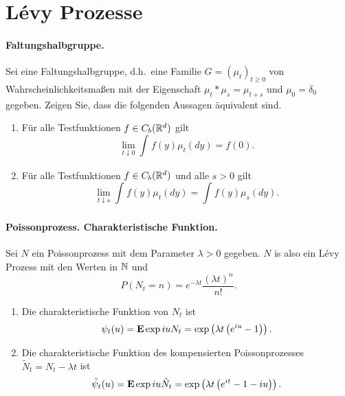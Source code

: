 \section{L\'evy Prozesse}

\paragraph{Faltungshalbgruppe.}
Sei eine Faltungshalbgruppe, d.h.\ eine Familie $G=(\mu_t)_{t\geq 0}$ von
Wahrscheinlichkeitsmaßen mit der Eigenschaft $\mu_t * \mu_s = \mu_{t+s}$ und
$\mu_0 = \delta_0$ gegeben. Zeigen Sie, dass die folgenden Aussagen äquivalent
sind.
\begin{enumerate}
    \item Für alle Testfunktionen $f\in C_b(\mathbb R^d)$ gilt
        \begin{equation*}
            \lim_{t\downarrow 0} \int_{}^{} f(y) \mu_t(dy) = f(0).
        \end{equation*}
    \item Für alle Testfunktionen $f\in C_b(\mathbb R^d)$ und alle $s>0$ gilt
        \begin{equation*}
            \lim_{t\downarrow s} \int_{}^{} f(y) \mu_t(dy) =
            \int_{}^{} f(y) \mu_s(dy). 
        \end{equation*}
\end{enumerate}

\paragraph{Poissonprozess. Charakteristische Funktion. } Sei $N$ ein
Poissonprozess mit dem Parameter $\lambda>0$ gegeben. $N$ is also ein L\'evy
Prozess mit den Werten in $\mathbb N$ und 
\begin{equation*}
    P(N_t = n) = e^{- \lambda t} \frac{ (\lambda t)^n}{ n!}.
\end{equation*}
\begin{enumerate}
    \item Die charakteristische Funktion von $N_t$ ist 
        \begin{equation*}
            \psi_t(u) = \mathbf{E} \exp iu N_t = \exp \left( \lambda t \left( e^{iu} -1\right) \right).
        \end{equation*}
    \item Die charakteristische Funktion des kompensierten Poissonprozesses
        $\tilde N_t = N_t - \lambda t$ ist 
        \begin{equation*}
            \tilde \psi_t (u) = \mathbf{E} \exp iu \tilde N_t = 
            \exp \left( \lambda t \left( e^{it}-1-iu \right) \right). 
        \end{equation*}
\end{enumerate} 

